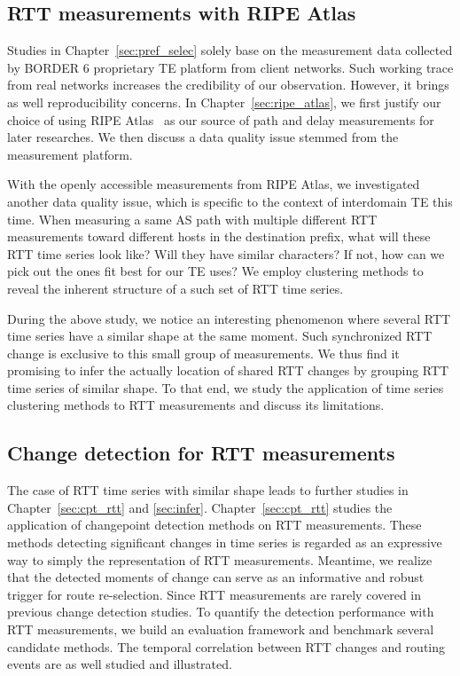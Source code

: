 \subsection{RTT measurements with RIPE Atlas}
Studies in Chapter~\ref{sec:pref_selec} solely base on the measurement data collected by BORDER 6 proprietary TE platform from client networks. Such working trace from real networks increases the credibility of our observation. However, it brings as well reproducibility concerns.
In Chapter~\ref{sec:ripe_atlas}, we first justify our choice of using RIPE Atlas~\cite{atlas} as our source of path and delay measurements for later researches.
We then discuss a data quality issue stemmed from the measurement platform.

With the openly accessible measurements from RIPE Atlas, we investigated another data quality issue, which is specific to the context of interdomain TE this time. When measuring a same AS path with multiple different \acf{RTT} measurements toward different hosts in the destination prefix, what will these RTT time series look like? Will they have similar characters? If not, how can we pick out the ones fit best for our TE uses? We employ clustering methods to reveal the inherent structure of a such set of RTT time series.

During the above study, we notice an interesting phenomenon where several RTT time series have a similar shape at the same moment. Such synchronized RTT change is exclusive to this small group of measurements.
We thus find it promising to infer the actually location of shared RTT changes by grouping RTT time series of similar shape. To that end, we study the application of time series clustering methods to RTT measurements and discuss its limitations.

\subsection{Change detection for RTT measurements}
The case of RTT time series with similar shape leads to further studies in Chapter~\ref{sec:cpt_rtt} and \ref{sec:infer}. Chapter~\ref{sec:cpt_rtt} studies the application of changepoint detection methods on RTT measurements. These methods detecting significant changes in time series is regarded as an expressive way to simply the representation of RTT measurements. Meantime, we realize that the detected moments of change can serve as an informative and robust trigger for route re-selection.
Since RTT measurements are rarely covered in previous change detection studies. To quantify the detection performance with RTT measurements, we build an evaluation framework and benchmark several candidate methods.
The temporal correlation between RTT changes and routing events are as well studied and illustrated.

